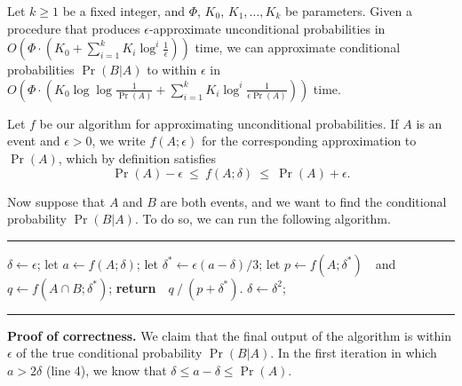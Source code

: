 \begin{subappendices}
\begin{lemma} \label{lem:logeps-conditioner}
    Let $k \ge 1$ be a fixed integer, and $\Phi$, $K_0$, $K_1, \ldots, K_k$ be parameters. 
     Given a procedure that
    produces $\epsilon$-approximate unconditional probabilities in 
    $O(\Phi \cdot (K_0 +  \sum_{i=1}^k K_i \log^i \frac1\epsilon) )$ time, 
    we can approximate conditional probabilities $\Pr(B|A)$ to within $\epsilon$ in 
    $
    O(\Phi  \cdot (K_0 \log \log \frac1{\Pr(A)} + \sum_{i=1}^k K_i \log^i \frac1{\epsilon \Pr(A)} ))
    $ 
    time.
\end{lemma}
\begin{lproof}
    Let $f$ be our algorithm for approximating unconditional probabilities.
    If $A$ is an event and $\epsilon > 0$, we write $f(A ; \epsilon)$
    for the corresponding approximation to $\Pr(A)$, which by definition satisfies
    \[
        \Pr(A) - \epsilon ~\le~ f(A; \delta) ~\le~ \Pr(A) + \epsilon.
    \]
    
    Now suppose that $A$ and $B$ are both events, and
    we want to find the conditional probability 
    $\Pr(B|A)$.
    To do so, we can run the following algorithm.     
    
    \rule{4in}{0.2ex}
    \begin{algorithmic}[1]
        \STATE $\delta \gets \epsilon$;
        \LOOP
            \STATE let $a \gets f(A; \delta)$;
            \smallskip
                \STATE let $\delta^* \gets \epsilon (a - \delta) /3$;
                \STATE let $p \gets f(A ; \delta^*)$~~and~~ $q \gets f(A \cap B ; \delta^*)$;
                \STATE \textbf{return}~~$q ~/~ (p + \delta^*)$.
            \ELSE
                \STATE $\delta \gets \delta^2$;
            \ENDIF
        \ENDLOOP

    \end{algorithmic}
    \rule{4in}{0.2ex}
    
    \textbf{Proof of correctness.}
    We claim that the final output of the algorithm is within $\epsilon$ of the true conditional probability $\Pr(B|A)$.
    In the first iteration in which $a > 2\delta$ (line 4),
    we know that $\delta \le a - \delta \le \Pr(A)$.


\end{lproof}
\end{subappendices}
